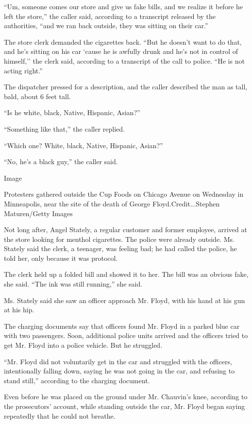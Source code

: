 ``Um, someone comes our store and give us fake bills, and we realize it
before he left the store,'' the caller said, according to a transcript
released by the authorities, ``and we ran back outside, they was sitting
on their car.''

The store clerk demanded the cigarettes back. ``But he doesn't want to
do that, and he's sitting on his car `cause he is awfully drunk and he's
not in control of himself,'' the clerk said, according to a transcript
of the call to police. ``He is not acting right.''

The dispatcher pressed for a description, and the caller described the
man as tall, bald, about 6 feet tall.

``Is he white, black, Native, Hispanic, Asian?''

``Something like that,'' the caller replied.

``Which one? White, black, Native, Hispanic, Asian?''

``No, he's a black guy,'' the caller said.

Image

Protesters gathered outside the Cup Foods on Chicago Avenue on Wednesday
in Minneapolis, near the site of the death of George
Floyd.Credit...Stephen Maturen/Getty Images

Not long after, Angel Stately, a regular customer and former employee,
arrived at the store looking for menthol cigarettes. The police were
already outside. Ms. Stately said the clerk, a teenager, was feeling
bad; he had called the police, he told her, only because it was
protocol.

The clerk held up a folded bill and showed it to her. The bill was an
obvious fake, she said. ``The ink was still running,'' she said.

Ms. Stately said she saw an officer approach Mr. Floyd, with his hand at
his gun at his hip.

The charging documents say that officers found Mr. Floyd in a parked
blue car with two passengers. Soon, additional police units arrived and
the officers tried to get Mr. Floyd into a police vehicle. But he
struggled.

``Mr. Floyd did not voluntarily get in the car and struggled with the
officers, intentionally falling down, saying he was not going in the
car, and refusing to stand still,'' according to the charging document.

Even before he was placed on the ground under Mr. Chauvin's knee,
according to the prosecutors' account, while standing outside the car,
Mr. Floyd began saying repeatedly that he could not breathe.

